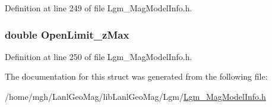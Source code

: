 Definition at line 249 of file Lgm\_\-MagModelInfo.h.\hypertarget{struct_lgm___mag_model_info_8872d2067eaccc17854b021eb2db82a1}{
\subsubsection[{OpenLimit\_\-zMax}]{\setlength{\rightskip}{0pt plus 5cm}double {\bf OpenLimit\_\-zMax}}}
\label{struct_lgm___mag_model_info_8872d2067eaccc17854b021eb2db82a1}




Definition at line 250 of file Lgm\_\-MagModelInfo.h.

The documentation for this struct was generated from the following file:\begin{CompactItemize}
\item 
/home/mgh/LanlGeoMag/libLanlGeoMag/Lgm/\hyperlink{_lgm___mag_model_info_8h}{Lgm\_\-MagModelInfo.h}\end{CompactItemize}
